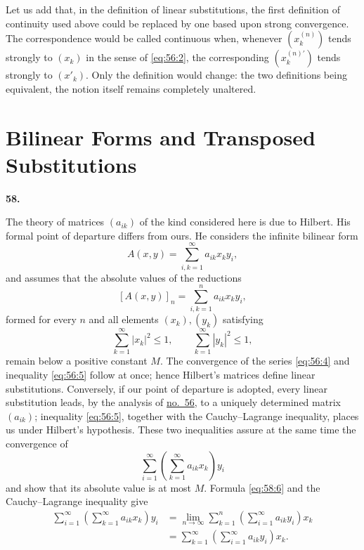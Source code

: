 \documentclass[
  paper=b5,
  fontsize=13pt,
  twoside=true,
  open=any,
  bookmarkpackage=false,
  chapterprefix=true,
  headings=normal
]{scrbook}
\theoremstyle{definition}
\newcommand{\numberedparagraph}[1]{%
  \par\medskip\phantomsection\label{sec:#1}%
  \noindent\textbf{#1.}\enspace
}
\begin{document}
Let us add that, in the definition of linear substitutions, the first
definition of continuity used above could be replaced by one based upon
strong convergence. The correspondence would be called continuous when,
whenever $(x_k^{(n)})$ tends strongly to $(x_k)$ in the sense of
\eqref{eq:56:2}, the corresponding $(x_k^{(n)\prime})$ tends strongly to
$(x'_k)$. Only the definition would change: the two definitions being
equivalent, the notion itself remains completely unaltered.

\section{Bilinear Forms and Transposed Substitutions}
\label{sec:bilinear-transpose}

\numberedparagraph{58}
The theory of matrices $(a_{ik})$ of the kind considered here is due to
Hilbert. His formal point of departure differs from ours. He considers the
infinite bilinear form
\begin{equation}
  A(x,y)=\sum_{i,k=1}^{\infty}a_{ik}x_k y_i,
  \tag{6}\label{eq:58:6}
\end{equation}
and assumes that the absolute values of the reductions
\[
  [A(x,y)]_n=\sum_{i,k=1}^{n}a_{ik}x_k y_i,
\]
formed for every $n$ and all elements $(x_k),(y_k)$ satisfying
\begin{equation}
  \sum_{k=1}^{\infty}|x_k|^2\leq1,
  \qquad
  \sum_{k=1}^{\infty}|y_k|^2\leq1,
  \tag{7}\label{eq:58:7}
\end{equation}
remain below a positive constant $M$. The convergence of the series
\eqref{eq:56:4} and inequality \eqref{eq:56:5} follow at once; hence
Hilbert's matrices define linear substitutions. Conversely, if our point
of departure is adopted, every linear substitution leads, by the analysis
of \hyperref[sec:56]{no.~56}, to a uniquely determined matrix $(a_{ik})$;
inequality \eqref{eq:56:5}, together with the Cauchy--Lagrange inequality,
places us under Hilbert's hypothesis.
These two inequalities assure at the same time the convergence of
\[
  \sum_{i=1}^{\infty}
    \left(\sum_{k=1}^{\infty}a_{ik}x_k\right)y_i
\]
and show that its absolute value is at most $M$. Formula
\eqref{eq:58:6} and the Cauchy--Lagrange inequality give
\begin{equation}
\begin{split}
  \sum_{i=1}^{\infty}
    \left(\sum_{k=1}^{\infty}a_{ik}x_k\right)y_i
  &=\lim_{n\to\infty}\sum_{k=1}^{n}
    \left(\sum_{i=1}^{\infty}a_{ik}y_i\right)x_k\\
  &=\sum_{k=1}^{\infty}
    \left(\sum_{i=1}^{\infty}a_{ik}y_i\right)x_k.
\end{split}
  \tag{8}\label{eq:58:8}
\end{equation}
\end{document}
